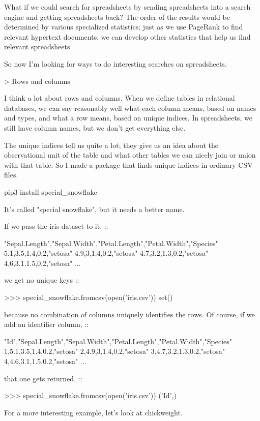 \documentclass{acm_proc_article-sp}
\begin{document}
What if we could search for spreadsheets
by sending spreadsheets into a search engine and getting spreadsheets back?
The order of the results would be determined by various specialized statistics;
just as we use PageRank to find relevant hypertext documents, we can develop
other statistics that help us find relevant spreadsheets.

So now I'm looking for ways to do interesting searches on spreadsheets.

> Rows and columns

I think a lot about rows and columns. When we define tables in relational
databases, we can say reasonably well what each column means, based on
names and types, and what a row means, based on unique indices.
In spreadsheets, we still have column names, but we don't get everything
else.

The unique indices tell us quite a lot; they give us an idea about the
observational unit of the table and what other tables we can nicely
join or union with that table. So I made a package that finds unique
indices in ordinary CSV files.

    pip3 install special_snowflake

It's called "special snowflake", but it needs a better name.

If we pass the iris dataset to it, ::

    "Sepal.Length","Sepal.Width","Petal.Length","Petal.Width","Species"
    5.1,3.5,1.4,0.2,"setosa"
    4.9,3,1.4,0.2,"setosa"
    4.7,3.2,1.3,0.2,"setosa"
    4.6,3.1,1.5,0.2,"setosa"
    ...

we get no unique keys ::

    >>> special_snowflake.fromcsv(open('iris.csv'))                                                                  
    set()

because no combination of columns uniquely identifies the rows.
Of course, if we add an identifier column, ::

    "Id","Sepal.Length","Sepal.Width","Petal.Length","Petal.Width","Species"
    1,5.1,3.5,1.4,0.2,"setosa"
    2,4.9,3,1.4,0.2,"setosa"
    3,4.7,3.2,1.3,0.2,"setosa"
    4,4.6,3.1,1.5,0.2,"setosa"
    ...

that one gets returned. ::

    >>> special_snowflake.fromcsv(open('iris.csv'))                                                                  
    {('Id',)}

For a more interesting example, let's look at chickweight.
\end{document}
